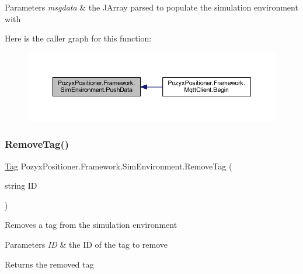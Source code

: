 \begin{DoxyParams}{Parameters}
{\em msgdata} & the J\+Array parsed to populate the simulation environment with\\
\hline
\end{DoxyParams}
Here is the caller graph for this function\+:
\nopagebreak
\begin{figure}[H]
\begin{center}
\leavevmode
\includegraphics[width=350pt]{class_pozyx_positioner_1_1_framework_1_1_sim_environment_a94e341475ddb03c2c27dd253748ad65a_icgraph}
\end{center}
\end{figure}
\mbox{\label{class_pozyx_positioner_1_1_framework_1_1_sim_environment_aa69448aa9bc85a646b57b753f5c5e483}} 
\subsubsection{\texorpdfstring{Remove\+Tag()}{RemoveTag()}}
{\footnotesize\ttfamily \hyperlink{class_pozyx_positioner_1_1_framework_1_1_tag}{Tag} Pozyx\+Positioner.\+Framework.\+Sim\+Environment.\+Remove\+Tag (\begin{DoxyParamCaption}\item[{string}]{ID }\end{DoxyParamCaption})}



Removes a tag from the simulation environment 


\begin{DoxyParams}{Parameters}
{\em ID} & the ID of the tag to remove\\
\hline
\end{DoxyParams}
\begin{DoxyReturn}{Returns}
the removed tag 
\end{DoxyReturn}
\mbox{\label{class_pozyx_positioner_1_1_framework_1_1_sim_environment_a0d114a29811d19d1376273cb078f6f61}} 
